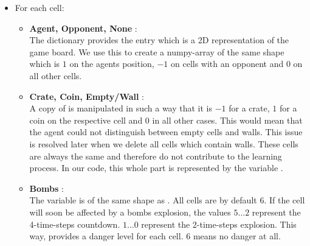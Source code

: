 	\begin{itemize}
		\item For each cell:
		\begin{itemize}
			\item \textbf{Agent, Opponent, None }:\\
			The dictionary provides the entry  which is a 2D representation of the game board. We use this to create a numpy-array  of the same shape which is $1$ on the agents position, $-1$ on cells with an opponent and $0$ on all other cells.
			\item \textbf{Crate, Coin, Empty/Wall }: \\
			A copy of  is manipulated in such a way that it is $-1$ for a crate, $1$ for a coin on the respective cell and $0$ in all other cases. This would mean that the agent could not distinguish between empty cells and walls. This issue is resolved later when we delete all cells which contain walls. These cells are always the same and therefore do not contribute to the learning process. In our code, this whole part is represented by the variable .
			\item \textbf{Bombs} :\\
			The variable  is of the same shape as . All cells are by default $6$. If the cell will soon be affected by a bombs explosion, the values $5\dots2$ represent the 4-time-steps countdown. $1\dots0$ represent the 2-time-steps explosion. This way,  provides a danger level for each cell. $6$ means no danger at all.
			

\end{itemize}
\end{itemize}

